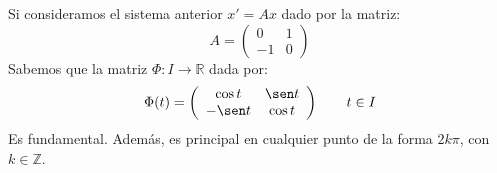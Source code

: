 \begin{ejemplo}
    Si consideramos el sistema anterior $x' = Ax$ dado por la matriz:
    \begin{equation*}
        A = \left(\begin{array}{cc}
                0 & 1 \\
                -1 & 0
        \end{array}\right)
    \end{equation*}
    Sabemos que la matriz $\Phi:I\rightarrow\mathbb{R}$ dada por:
    \begin{equation*}
        \Phi(t) = \left(\begin{array}{cc}
                \cos t & \sen t \\
                -\sen t & \cos t
        \end{array}\right) \qquad t\in I
    \end{equation*}
    Es fundamental. Además, es principal en cualquier punto de la forma $2k\pi$, con $k\in \mathbb{Z}$.
\end{ejemplo}

